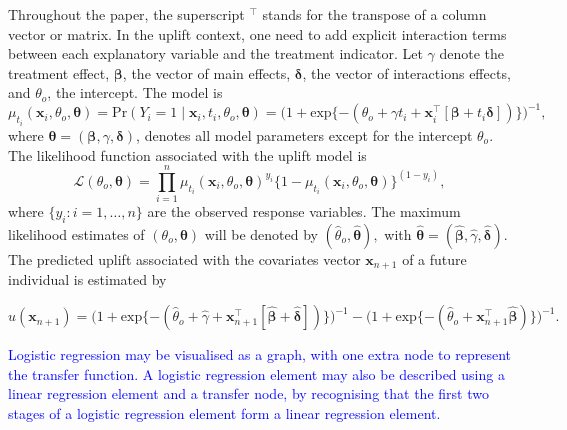 \documentclass{article}
\def\x{\mathbf x}
\begin{document}
Throughout the paper, the superscript $^\top$ stands for the transpose of a column vector or matrix.
In the uplift context, one need to add explicit interaction terms between each explanatory variable and the treatment indicator.
Let $\gamma$ denote the treatment effect, $\boldsymbol{\beta}$, the vector of main effects, $\boldsymbol{\delta}$, the vector of interactions effects, and $\theta_o$, the intercept. 
The model is 
\begin{equation}
  \mu_{t_i}(\x_i, \theta_o, \boldsymbol{\theta}) = \mathrm{Pr} (Y_i = 1 \mid \mathbf{x}_i, t_i, \theta_o, \boldsymbol{\theta}) =
  \bigl( 1+ \mathrm{exp}\{-(\theta_o + \gamma t_i + \mathbf{x}_i^\top [\boldsymbol{\beta} + t_i \boldsymbol{\delta}] ) \} \bigr)^{-1},
\label{eq:pitheta}
\end{equation}
where $\boldsymbol{\theta} = (\boldsymbol{\beta}, \gamma, \boldsymbol{\delta})$, denotes all model parameters except for the intercept $\theta_o$. The likelihood function associated with the uplift model is 
\begin{equation}
    \mathcal{L}(\theta_o, \boldsymbol{\theta}) =  \prod_{i=1}^{n} \mu_{t_i}(\x_i, \theta_o, \boldsymbol{\theta})^{y_i} \{1-\mu_{t_i}(\x_i, \theta_o, \boldsymbol{\theta})\}^{(1-y_i)},
    \label{eq:uplift_likelihood}
\end{equation}
where $\{y_i : i=1,\ldots,n\}$ are the observed response variables.
The maximum likelihood estimates of  $(\theta_o, \boldsymbol{\theta})$ will be denoted by $(\hat{\theta}_o, \hat{\boldsymbol{\theta}}),$
with $\hat{\boldsymbol{\theta}} = (\boldsymbol{\hat{\beta}}, \hat{\gamma}, \boldsymbol{\hat{\delta}})$.
%
The predicted uplift associated with the covariates vector $\mathbf{x}_{n+1}$ of a future individual is estimated by

$$ \hat{u}(\mathbf{x}_{n+1}) = \bigl(1+\mathrm{exp}\{-(\hat{\theta}_o + \hat{\gamma} + \mathbf{x}_{n+1}^\top[ \boldsymbol{\hat{\beta}} + \boldsymbol{\hat{\delta}}] )\}\bigr)^{-1} - \bigl(1+ \mathrm{exp}\{-(\hat{\theta}_o + \mathbf{x}_{n+1}^\top \boldsymbol{\hat{\beta}})\}\bigr)^{-1}.$$



\textcolor{blue}{Logistic regression may be visualised as a graph, with one extra node to represent the transfer function. A logistic regression element may also be described using a linear regression element and a transfer node, by recognising that the first two stages of a logistic regression element form a linear regression element.}
\end{document}
